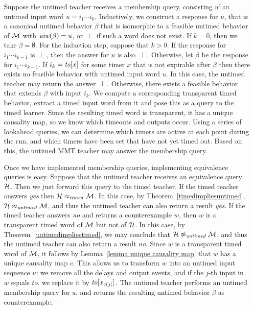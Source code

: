 Suppose the untimed teacher receives a membership query, consisting of an untimed input word
$u = i_1 \cdots i_k$.
Inductively, we construct a response for $u$, that is a canonical untimed behavior $\beta$ that is
isomorphic to a feasible untimed behavior of ${\mathcal M}$ with $\mathit{uiw}(\beta) = u$,
or $\perp$ if such a word does not exist.
If $k=0$, then we take $\beta = \emptyset$.
For the induction step, suppose that $k>0$.
If the response for $i_1 \cdots i_{k-1}$ is $\perp$, then the answer for $u$ is also $\perp$.
Otherwise, let $\beta$ be the response for $i_1 \cdots i_{k-1}$.
If $i_k = \mathit{to}[x]$ for some timer $x$ that is not expirable after $\beta$ then there exists no feasible behavior
with untimed input word $u$. In this case, the untimed teacher may return the answer $\perp$.
Otherwise, there exists a feasible behavior that extends $\beta$ with input $i_k$. We compute
a corresponding transparent timed behavior, extract a timed input word from it and pose this as a query to the timed learner.
Since the resulting timed word is transparent, it has a unique causality map, so we know
which timeouts and outputs occur.
Using a series of lookahead queries, we can determine which timers are active at each point during the run,
and which timers have been set that have not yet timed out.
Based on this, the untimed MMT teacher may answer the membership query.

Once we have implemented membership queries, implementing equivalence queries is easy.
Suppose that the untimed teacher receives an equivalence query ${\mathcal H}$.
Then we just forward this query to the timed teacher.
If the timed teacher answers \emph{yes} then ${\mathcal H} \approx_{\mathit{timed}} {\mathcal M}$.
In this case, by Theorem~\ref{timedimpliesuntimed}, ${\mathcal H} \approx_{\mathit{untimed}} {\mathcal M}$,
and thus the untimed teacher can also return a result \emph{yes}.
If the timed teacher answers \emph{no} and returns a counterexample $w$,
then $w$ is a transparent timed word of ${\mathcal M}$ but not of ${\mathcal H}$.
In this case, by Theorem~\ref{untimedimpliestimed}, we may conclude that
${\mathcal H} \not\approx_{\mathit{untimed}} {\mathcal M}$, and thus the untimed teacher can also return a result \emph{no}.
Since $w$ is a transparent timed word of ${\mathcal M}$, it 
\iflong
follows by Lemma~\ref{lemma unique causality map} that $w$ 
\fi
has a unique causality map $c$.
This allows us to transform $w$ into an untimed input sequence $u$: 
we remove all the delays and output events, and if the $j$-th
input in $w$ equals $\mathit{to}$, we replace it by $\mathit{to}[x_{c(j)}]$.
The untimed teacher performs an untimed membership query for $u$, and returns the resulting 
untimed behavior $\beta$ as counterexample.






